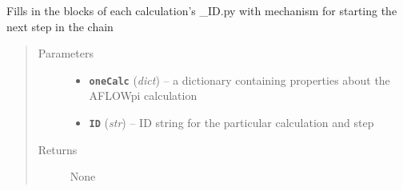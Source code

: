 \documentclass[letterpaper,10pt,english]{sphinxmanual}
\begin{document}
\begin{fulllineitems}
\label{prep:prep.__fillTemplate}
Fills in the blocks of each calculation's \_ID.py with mechanism for starting the next step in the chain
\begin{quote}\begin{description}
\item[{Parameters}] \leavevmode\begin{itemize}
\item {} 
\textbf{\texttt{oneCalc}} (\emph{dict}) -- a dictionary containing properties about the AFLOWpi calculation

\item {} 
\textbf{\texttt{ID}} (\emph{str}) -- ID string for the particular calculation and step

\end{itemize}

\item[{Returns}] \leavevmode
None

\end{description}\end{quote}

\end{fulllineitems}

\end{document}
